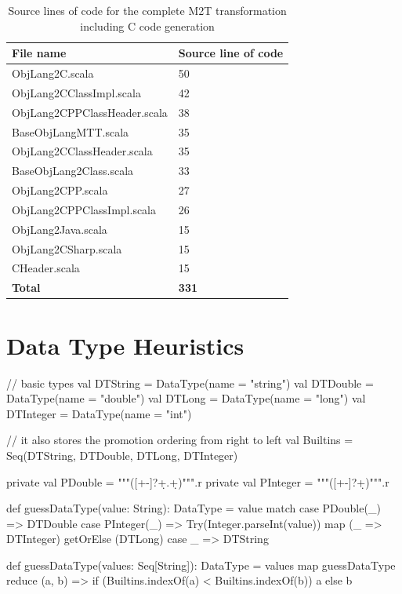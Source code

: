 \begin{table}[h!]
	\centering
  \begin{tabular}{l|l}
  \hline
  \textbf{File name}                  & \textbf{Source line of code} \\ \hline
  ObjLang2C.scala              & 50                  \\
  ObjLang2CClassImpl.scala     & 42                  \\
  ObjLang2CPPClassHeader.scala & 38                  \\
  BaseObjLangMTT.scala         & 35                  \\
  ObjLang2CClassHeader.scala   & 35                  \\
  BaseObjLang2Class.scala      & 33                  \\
  ObjLang2CPP.scala            & 27                  \\
  ObjLang2CPPClassImpl.scala   & 26                  \\
  ObjLang2Java.scala           & 15                  \\
  ObjLang2CSharp.scala         & 15                  \\
  CHeader.scala                & 15                  \\ \hline
  \textbf{Total}                        & \textbf{331}                 \\ \hline
  \end{tabular}
  \caption{Source lines of code for the complete M2T transformation including C code generation}
\end{table}


\section{Data Type Heuristics}
\label{sec:AppendixGuessDataType}

\begin{scalacode}
  // basic types
  val DTString = DataType(name = "string")
  val DTDouble = DataType(name = "double")
  val DTLong = DataType(name = "long")
  val DTInteger = DataType(name = "int")

  // it also stores the promotion ordering from right to left
  val Builtins = Seq(DTString, DTDouble, DTLong, DTInteger)

  private val PDouble = """([+-]?\d+.\d+)""".r
  private val PInteger = """([+-]?\d+)""".r

  def guessDataType(value: String): DataType = value match {
    case PDouble(_) => DTDouble
    case PInteger(_) => Try(Integer.parseInt(value)) map (_ => DTInteger) getOrElse (DTLong)
    case _ => DTString
  }

  def guessDataType(values: Seq[String]): DataType =
    values map guessDataType reduce { (a, b) =>
      if (Builtins.indexOf(a) < Builtins.indexOf(b)) a else b
    }
\end{scalacode}


